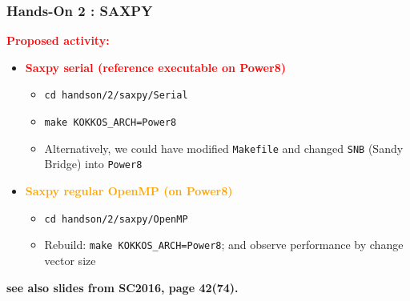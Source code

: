 \begin{frame}[fragile=singleslide]
  \frametitle{Hands-On 2 : SAXPY}

  {\large \textcolor{red}{\bf Proposed activity:}}
  \begin{itemize}
  \item \textcolor{red}{\textbf{Saxpy serial (reference executable on Power8)}}
    \begin{itemize}
    \item \texttt{cd handson/2/saxpy/Serial}
    \item \texttt{make KOKKOS\_ARCH=Power8}
    \item Alternatively, we could have modified \texttt{Makefile} and changed \texttt{SNB} (Sandy Bridge) into \texttt{Power8}
    \end{itemize}
  \item \textcolor{orange}{\textbf{Saxpy regular OpenMP (on Power8)}}
    \begin{itemize}
    \item \texttt{cd handson/2/saxpy/OpenMP}
    \item Rebuild: \texttt{make KOKKOS\_ARCH=Power8}; and observe performance by change vector size
    \end{itemize}
  \end{itemize}

  \textbf{see also slides from SC2016, page 42(74).}
  
\end{frame}

